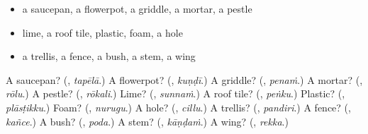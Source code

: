 \begin{itemize}
\raggedright
  \item a saucepan, a flowerpot, a griddle, a mortar, a pestle
  \item lime, a roof tile, plastic, foam, a hole
  \item a trellis, a fence, a bush, a stem, a wing
\end{itemize}

\begin{tcolorbox}[breakable,colback=teal!4,colframe=teal!35!black,title={Before you move on}]
A saucepan? (\textbf{}, \emph{tapēlā}.) A flowerpot? (\textbf{}, \emph{kuṇḍī}.) A griddle? (\textbf{}, \emph{penaṁ}.) A mortar? (\textbf{}, \emph{rōlu}.) A pestle? (\textbf{}, \emph{rōkali}.) Lime? (\textbf{}, \emph{sunnaṁ}.) A roof tile? (\textbf{}, \emph{peṅku}.) Plastic? (\textbf{}, \emph{plāsṭikku}.) Foam? (\textbf{}, \emph{nurugu}.) A hole? (\textbf{}, \emph{cillu}.) A trellis? (\textbf{}, \emph{pandiri}.) A fence? (\textbf{}, \emph{kañce}.) A bush? (\textbf{}, \emph{poda}.) A stem? (\textbf{}, \emph{kāṇḍaṁ}.) A wing? (\textbf{}, \emph{rekka}.)
\end{tcolorbox}

